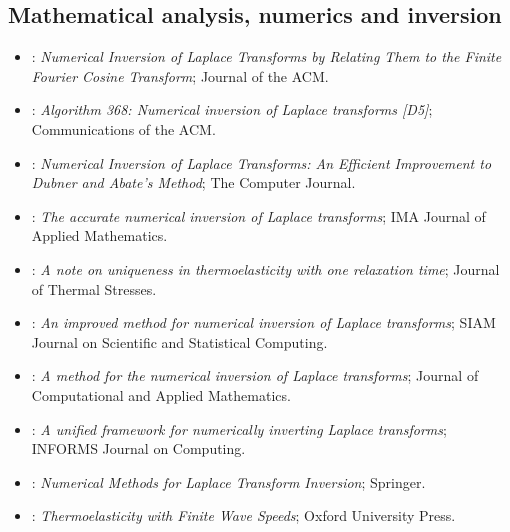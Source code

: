 \subsection{Mathematical analysis, numerics and inversion}
\begin{itemize}\itemsep0pt\small
\item \citet{DubnerAbate1968}: \emph{Numerical Inversion of Laplace Transforms by Relating Them to the Finite Fourier Cosine Transform}; Journal of the ACM.
\item \citet{Stehfest1970}: \emph{Algorithm 368: Numerical inversion of Laplace transforms [D5]}; Communications of the ACM.
\item \citet{Durbin1974}: \emph{Numerical Inversion of Laplace Transforms: An Efficient Improvement to Dubner and Abate's Method}; The Computer Journal.
\item \citet{Talbot1979}: \emph{The accurate numerical inversion of Laplace transforms}; IMA Journal of Applied Mathematics.
\item \citet{Ignaczak1982}: \emph{A note on uniqueness in thermoelasticity with one relaxation time}; Journal of Thermal Stresses.
\item \citet{deHoog1982}: \emph{An improved method for numerical inversion of Laplace transforms}; SIAM Journal on Scientific and Statistical Computing.
\item \citet{HonigHirdes1984}: \emph{A method for the numerical inversion of Laplace transforms}; Journal of Computational and Applied Mathematics.
\item \citet{AbateWhitt2006}: \emph{A unified framework for numerically inverting Laplace transforms}; INFORMS Journal on Computing.
\item \citet{Cohen2007}: \emph{Numerical Methods for Laplace Transform Inversion}; Springer.
\item \citet{IgnaczakOstoja2010}: \emph{Thermoelasticity with Finite Wave Speeds}; Oxford University Press.
\end{itemize}
